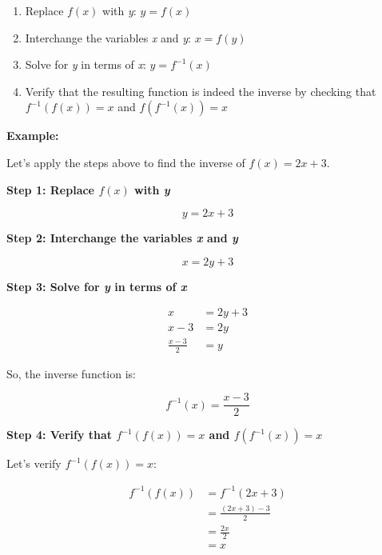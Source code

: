 \begin{enumerate}
	
	\item Replace \(f (x)\) with \emph{y}: \(y = f (x)\)
	
	\item Interchange the variables \emph{x} and \emph{y}: \(x = f (y)\)
	
	\item Solve for \emph{y} in terms of \emph{x}: \(y = f^{-1} (x)\)
	
	\item Verify that the resulting function is indeed the inverse by checking that \(f^{-1}(f(x)) = x\) 
		  and \(f (f^{-1} (x)) = x\)

		\end{enumerate}

\textbf{Example:}
\vspace{\baselineskip}

Let's apply the steps above to find the inverse of \(f (x) = 2x + 3\).
\vspace{\baselineskip}

\textbf{Step 1: Replace \(f(x)\) with \emph{y}}

\[
	y = 2x + 3
\]

\textbf{Step 2: Interchange the variables \emph{x} and \emph{y}}

\[
	x = 2y + 3
\]

\textbf{Step 3: Solve for \emph{y} in terms of \emph{x}}

\begin{align*}
	x               & = 2y + 3 \\
	x - 3           & = 2y     \\
	\frac{x - 3}{2} & = y
\end{align*}

So, the inverse function is:

\[
	f^{-1}(x) = \frac{x - 3}{2}
\]

\textbf{Step 4: Verify that \(f^{-1} (f (x)) = x\) and \(f(f^{-1} (x)) = x\)}

Let's verify \(f^{-1} (f (x)) = x\):

\begin{align*}
	f^{-1}(f(x)) & = f^{-1}(2x + 3)         \\
	             & = \frac{(2x + 3) - 3}{2} \\
	             & = \frac{2x}{2}           \\
	             & = x
\end{align*}

